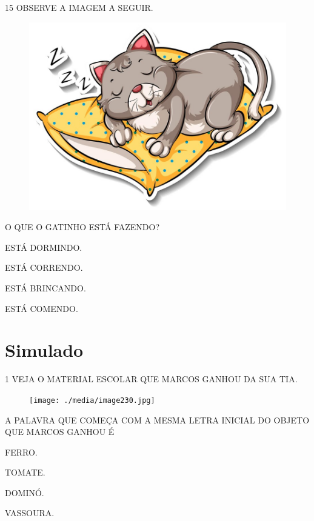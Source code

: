 \num{15} OBSERVE A IMAGEM A SEGUIR.

\begin{figure}[H]
\centering
\includegraphics[width=.7\textwidth]{./media/image229.jpg}
\end{figure}

O QUE O GATINHO ESTÁ FAZENDO?

\begin{escolha}

\item ESTÁ DORMINDO.

\item ESTÁ CORRENDO.

\item ESTÁ BRINCANDO.

\item ESTÁ COMENDO.

\end{escolha}

\chapter[Simulado 3]{Simulado}

\num{1} VEJA O MATERIAL ESCOLAR QUE MARCOS GANHOU DA SUA TIA.

\begin{figure}[H]
\centering
\texttt{[image: ./media/image230.jpg]}
\end{figure}

A PALAVRA QUE COMEÇA COM A MESMA LETRA INICIAL DO OBJETO QUE MARCOS GANHOU É

\begin{escolha}

\item FERRO.

\item TOMATE.

\item DOMINÓ.

\item VASSOURA.

\end{escolha}

